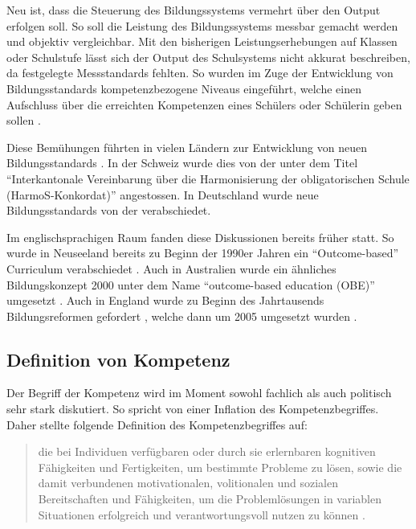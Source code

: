 Neu ist, dass die Steuerung des Bildungssystems vermehrt über den Output erfolgen soll. So soll die Leistung des Bildungssystems messbar gemacht werden und objektiv vergleichbar. Mit den bisherigen Leistungserhebungen auf Klassen oder Schulstufe lässt sich der Output des Schulsystems nicht akkurat beschreiben, da festgelegte Messstandards fehlten. So wurden im Zuge der Entwicklung von Bildungsstandards kompetenzbezogene Niveaus eingeführt, welche einen Aufschluss über die erreichten Kompetenzen eines Schülers oder Schülerin geben sollen \citep{Oelkers2008}.


Diese Bemühungen führten in vielen Ländern zur Entwicklung von neuen Bildungsstandards \citep{Berner2006}. In der Schweiz wurde dies von der \citet{EDKSchweizerKonfernezderKantonalenErziehungsdirektoren2004} unter dem Titel "`Interkantonale Vereinbarung über die Harmonisierung der obligatorischen Schule (HarmoS-Konkordat)"' angestossen. In Deutschland wurde neue Bildungsstandards von der \citet{Kultusministerkonferenz2004} verabschiedet.

Im englischsprachigen Raum fanden diese Diskussionen bereits früher statt. So wurde in Neuseeland bereits zu Beginn der 1990er Jahren ein "`Outcome-based"' Curriculum verabschiedet \citep{McGee1996}. Auch in Australien wurde ein ähnliches Bildungskonzept 2000 unter dem Name "`outcome-based education (OBE)"' umgesetzt  \citep{Killen2000}. Auch in England wurde zu Beginn des Jahrtausends Bildungsreformen gefordert \citep{Millar1999}, welche dann um 2005 umgesetzt wurden \citep{Huber2006}.




\subsection{Definition von Kompetenz}

Der Begriff der Kompetenz wird im Moment sowohl fachlich als auch politisch sehr stark diskutiert. So spricht \citet{Weinert2001b} von einer Inflation des Kompetenzbegriffes.
Daher stellte \citet[S.27]{Weinert2001a} folgende Definition des Kompetenzbegriffes auf:

\begin{quote}
 die bei Individuen verfügbaren oder durch sie erlernbaren kognitiven Fähigkeiten und Fertigkeiten, um bestimmte Probleme zu lösen, sowie die damit verbundenen motivationalen, volitionalen und sozialen Bereitschaften und Fähigkeiten, um die Problemlösungen in variablen Situationen erfolgreich und verantwortungsvoll nutzen zu können \citep[S.27]{Weinert2001a}.
\end{quote}


